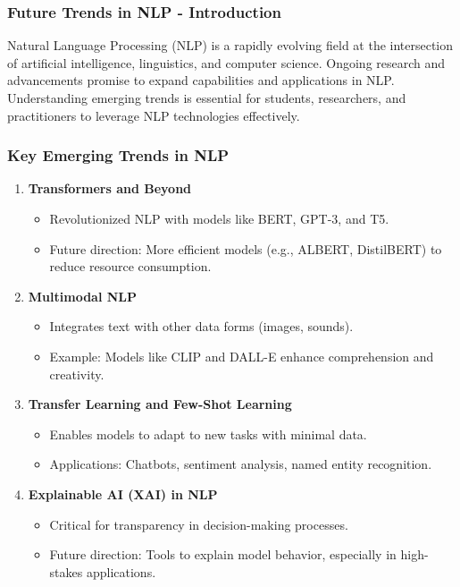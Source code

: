 \documentclass[aspectratio=169]{beamer}
\begin{document}
\begin{frame}[fragile]
    \frametitle{Future Trends in NLP - Introduction}
    Natural Language Processing (NLP) is a rapidly evolving field at the intersection of artificial intelligence, linguistics, and computer science. Ongoing research and advancements promise to expand capabilities and applications in NLP. Understanding emerging trends is essential for students, researchers, and practitioners to leverage NLP technologies effectively.
\end{frame}

\begin{frame}[fragile]
    \frametitle{Key Emerging Trends in NLP}
    \begin{enumerate}
        \item \textbf{Transformers and Beyond}
        \begin{itemize}
            \item Revolutionized NLP with models like BERT, GPT-3, and T5.
            \item Future direction: More efficient models (e.g., ALBERT, DistilBERT) to reduce resource consumption.
        \end{itemize}
        
        \item \textbf{Multimodal NLP}
        \begin{itemize}
            \item Integrates text with other data forms (images, sounds).
            \item Example: Models like CLIP and DALL-E enhance comprehension and creativity.
        \end{itemize}
        
        \item \textbf{Transfer Learning and Few-Shot Learning}
        \begin{itemize}
            \item Enables models to adapt to new tasks with minimal data.
            \item Applications: Chatbots, sentiment analysis, named entity recognition.
        \end{itemize}
        
        \item \textbf{Explainable AI (XAI) in NLP}
        \begin{itemize}
            \item Critical for transparency in decision-making processes.
            \item Future direction: Tools to explain model behavior, especially in high-stakes applications.
        \end{itemize}
    \end{enumerate}
\end{frame}
\end{document}
